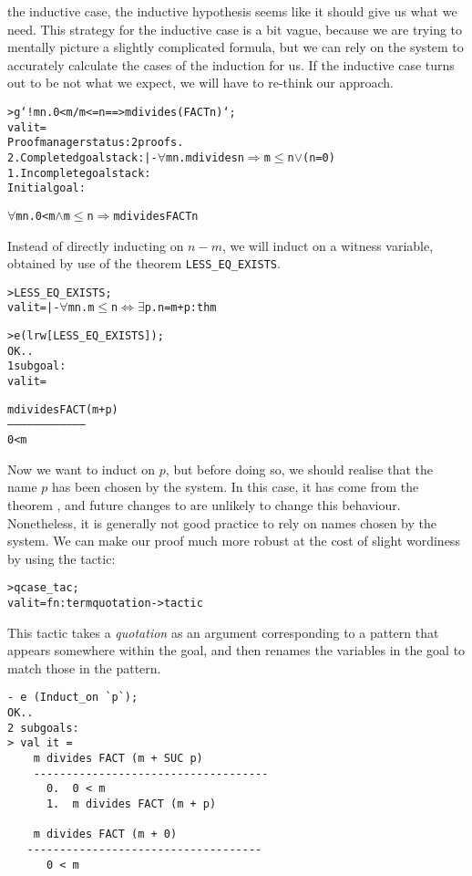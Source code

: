the inductive case, the inductive hypothesis seems like it should give
us what we need. This strategy for the inductive case is a bit vague,
because we are trying to mentally picture a slightly complicated
formula, but we can rely on the system to accurately calculate the
cases of the induction for us. If the inductive case turns out to be
not what we expect, we will have to re-think our approach.
\begin{session}
\begin{alltt}
> g `!m n. 0 < m /\bs{} m <= n ==> m divides (FACT n)`;
val it =
   Proof manager status: 2 proofs.
2. Completed goalstack: |- \(\forall\)m n. m divides n \(\Rightarrow\) m \(\le\) n \(\lor\) (n = 0)
1. Incomplete goalstack:
     Initial goal:

     \(\forall\)m n. 0 < m \(\land\) m \(\le\) n \(\Rightarrow\) m divides FACT n
\end{alltt}
\end{session}
Instead of directly inducting on $n-m$, we will induct on a witness
variable, obtained by use of the theorem \verb+LESS_EQ_EXISTS+.
\begin{session}
\begin{alltt}
> LESS_EQ_EXISTS;
val it = |- \(\forall\)m n. m \(\le\) n \(\iff\) \(\exists\)p. n = m + p: thm

> e (lrw[LESS_EQ_EXISTS]);
OK..
1 subgoal:
val it =

m divides FACT (m + p)
------------------------------------
  0 < m
\end{alltt}
\end{session}
\noindent Now we want to induct on $p$, but before doing so, we should realise that the name $p$ has been chosen by the system.
In this case, it has come from the theorem , and future changes to \HOL{} are unlikely to change this behaviour.
Nonetheless, it is generally not good practice to rely on names chosen by the system.
We can make our proof much more robust at the cost of slight wordiness by using the  tactic:
\begin{session}
\begin{alltt}
> qcase_tac;
val it = fn : term quotation -> tactic
\end{alltt}
\end{session}
This tactic takes a \emph{quotation} as an argument corresponding to a pattern that appears somewhere within the goal, and then renames the variables in the goal to match those in the pattern.
\begin{session}
\begin{verbatim}
- e (Induct_on `p`);
OK..
2 subgoals:
> val it =
    m divides FACT (m + SUC p)
    ------------------------------------
      0.  0 < m
      1.  m divides FACT (m + p)

    m divides FACT (m + 0)
   ------------------------------------
      0 < m
\end{verbatim}
\end{session}
